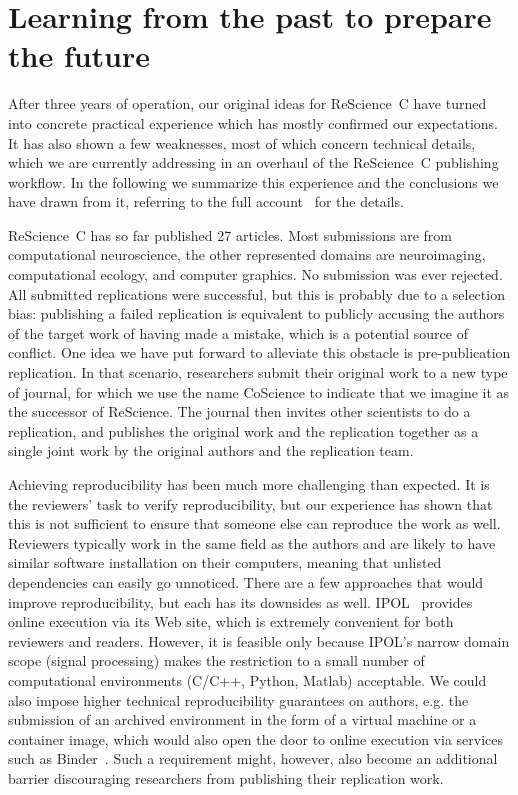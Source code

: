 \documentclass[runningheads]{llncs}
\begin{document}
\section{Learning from the past to prepare the future}

After three years of operation, our original ideas for ReScience~C have turned into concrete practical experience which has mostly confirmed our expectations. It has also shown a few weaknesses, most of which concern technical details, which we are currently addressing in an overhaul of the ReScience~C publishing workflow. In the following we summarize this experience and the conclusions we have drawn from it, referring to the full account~\cite{RougierSustainablecomputationalscience2017} for the details.

ReScience~C has so far published 27 articles. Most submissions are from computational neuroscience, the other represented domains are neuroimaging, computational ecology, and computer graphics. No submission was ever rejected. All submitted replications were successful, but this is probably due to a selection bias: publishing a failed replication is equivalent to publicly accusing the authors of the target work of having made a mistake, which is a potential source of conflict. One idea we have put forward to alleviate this obstacle is pre-publication replication. In that scenario, researchers submit their original work to a new type of journal, for which we use the name CoScience to indicate that we imagine it as the successor of ReScience. The journal then invites other scientists to do a replication, and publishes the original work and the replication together as a single joint work by the original authors and the replication team.

Achieving reproducibility has been much more challenging than expected. It is the reviewers' task to verify reproducibility, but our experience has shown that this is not sufficient to ensure that someone else can reproduce the work as well. Reviewers typically work in the same field as the authors and are likely to have similar software installation on their computers, meaning that unlisted dependencies can easily go unnoticed. There are a few approaches that would improve reproducibility, but each has its downsides as well. IPOL~\cite{limareIPOLReviewedPublication2012} provides online execution via its Web site, which is extremely convenient for both reviewers and readers. However, it is feasible only because IPOL's narrow domain scope (signal processing) makes the restriction to a small number of computational environments (C/C++, Python, Matlab) acceptable. We could also impose higher technical reproducibility guarantees on authors, e.g. the submission of an archived environment in the form of a virtual machine or a container image, which would also open the door to online execution via services such as Binder~\cite{binder}. Such a requirement might, however, also become an additional barrier discouraging researchers from publishing their replication work.
\end{document}
